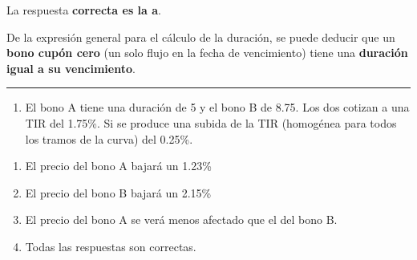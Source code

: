\documentclass[
  letterpaper,
  DIV=11,
  numbers=noendperiod]{scrreprt}
\providecommand{\tightlist}{%
  \setlength{\itemsep}{0pt}\setlength{\parskip}{0pt}}\usepackage{longtable,booktabs,array}
\begin{document}
\begin{tcolorbox}
\begin{tcolorbox}[enhanced jigsaw, toprule=.15mm, left=2mm, arc=.35mm, breakable, bottomrule=.15mm, opacityback=0, rightrule=.15mm, leftrule=.75mm, colframe=quarto-callout-note-color-frame, colback=white]
\begin{minipage}[t]{5.5mm}
\textcolor{quarto-callout-note-color}{\faInfo}
\end{minipage}%
\begin{minipage}[t]{\textwidth - 5.5mm}

La respuesta \textbf{correcta es la a}.

De la expresión general para el cálculo de la duración, se puede deducir
que un \textbf{bono cupón cero} (un solo flujo en la fecha de
vencimiento) tiene una \textbf{duración igual a su vencimiento}.

\end{minipage}%
\end{tcolorbox}

\begin{center}\rule{0.5\linewidth}{0.5pt}\end{center}

\begin{enumerate}
\def\labelenumi{\arabic{enumi}.}
\setcounter{enumi}{2}
\tightlist
\item
  El bono A tiene una duración de 5 y el bono B de 8.75. Los dos cotizan
  a una TIR del 1.75\%. Si se produce una subida de la TIR (homogénea
  para todos los tramos de la curva) del 0.25\%.
\end{enumerate}

\begin{enumerate}
\def\labelenumi{\alph{enumi}.}
\item
  El precio del bono A bajará un 1.23\%
\item
  El precio del bono B bajará un 2.15\%
\item
  El precio del bono A se verá menos afectado que el del bono B.
\item
  Todas las respuestas son correctas.
\end{enumerate}

\begin{tcolorbox}[enhanced jigsaw, toprule=.15mm, left=2mm, arc=.35mm, breakable, bottomrule=.15mm, opacityback=0, rightrule=.15mm, leftrule=.75mm, colframe=quarto-callout-note-color-frame, colback=white]
\begin{minipage}[t]{5.5mm}
\textcolor{quarto-callout-note-color}{\faInfo}
\end{minipage}%
\begin{minipage}[t]{\textwidth - 5.5mm}


\end{minipage}
\end{tcolorbox}
\end{tcolorbox}
\end{document}

